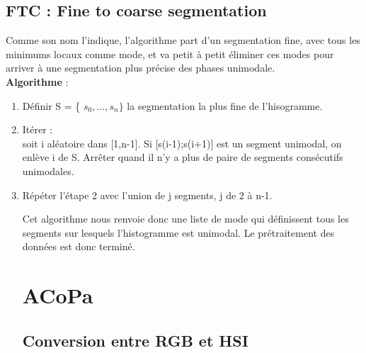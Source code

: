 \documentclass{article}
\begin{document}
{\subsection{FTC : Fine to coarse segmentation}
Comme son nom l'indique, l'algorithme part d'un segmentation fine, avec tous les minimums locaux comme mode, et va petit à petit éliminer ces modes pour arriver à une segmentation plus précise des phases unimodale. \\
\textbf{Algorithme} :\\
\begin{enumerate}
    \item Définir S = \{ $ s_0, ...,s_n \}$ la segmentation la plus fine de l'hisogramme.
    \item Itérer : \\ 
    soit i aléatoire dans [1,n-1]. Si [s(i-1);s(i+1)] est un segment unimodal, on enlève i de S. 
    Arrêter quand il n'y a plus de paire de segments consécutifs unimodales.
    \item Répéter l'étape 2 avec l'union de j segments, j de 2 à n-1. 

    Cet algorithme nous renvoie donc une liste de mode qui définissent tous les segments sur lesquels l'histogramme est unimodal. Le prétraitement des données est donc terminé.
\section{ACoPa}
\subsection{Conversion entre RGB et HSI}

\end{enumerate}}
\end{document}
